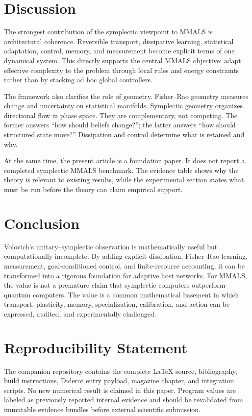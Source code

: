 \documentclass[11pt]{article}
\theoremstyle{definition}\newtheorem{definition}{Definition}\newtheorem{assumption}{Assumption}
\theoremstyle{remark}\newtheorem{remark}{Remark}
\begin{document}
\section{Discussion}
The strongest contribution of the symplectic viewpoint to MMALS is architectural coherence. Reversible transport, dissipative learning, statistical adaptation, control, memory, and measurement become explicit terms of one dynamical system. This directly supports the central MMALS objective: adapt effective complexity to the problem through local rules and energy constraints rather than by stacking ad hoc global controllers.

The framework also clarifies the role of geometry. Fisher--Rao geometry measures change and uncertainty on statistical manifolds. Symplectic geometry organizes directional flow in phase space. They are complementary, not competing. The former answers ``how should beliefs change?''; the latter answers ``how should structured state move?'' Dissipation and control determine what is retained and why.

At the same time, the present article is a foundation paper. It does not report a completed symplectic MMALS benchmark. The evidence table shows why the theory is relevant to existing results, while the experimental section states what must be run before the theory can claim empirical support.

\section{Conclusion}
Volovich's unitary--symplectic observation is mathematically useful but computationally incomplete. By adding explicit dissipation, Fisher--Rao learning, measurement, goal-conditioned control, and finite-resource accounting, it can be transformed into a rigorous foundation for adaptive host networks. For MMALS, the value is not a premature claim that symplectic computers outperform quantum computers. The value is a common mathematical basement in which transport, plasticity, memory, specialization, calibration, and action can be expressed, audited, and experimentally challenged.

\section*{Reproducibility Statement}
The companion repository contains the complete LaTeX source, bibliography, build instructions, Diderot entry payload, magazine chapter, and integration scripts. No new numerical result is claimed in this paper. Program values are labeled as previously reported internal evidence and should be revalidated from immutable evidence bundles before external scientific submission.
\end{document}
